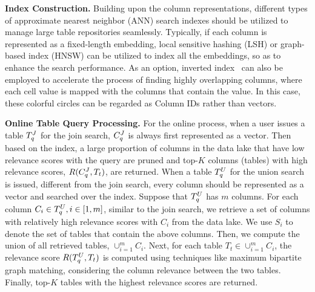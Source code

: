 
\noindent\textbf{Index Construction.} Building upon the  column representations, different types of approximate nearest neighbor (ANN) search indexes should be utilized to manage large table repositories seamlessly. Typically, if each column is represented as a fixed-length embedding, local sensitive hashing (LSH) or graph-based index (HNSW) can be utilized to index all the embeddings, so as to enhance the search performance.
 As an option, inverted index~\cite{} can also be employed  to  accelerate the process of finding highly overlapping columns, where each cell value is mapped with the columns that contain the value. In this case, these colorful circles can be regarded as  Column IDs rather than vectors.





\noindent\textbf{Online Table Query Processing.} For the online process, when a user issues a table $T^J_q$ for the join search, $C^J_q$ is always first represented as a vector. Then based on the index, a large proportion of columns in the data lake that have low relevance scores with the query are pruned and top-$K$ columns (tables) with high relevance scores, \ie $R(C^J_q, T_t)$, are returned. When a table $T^U_q$ for the union search is issued, different from the join search, every column should be represented as a vector and searched over the index.
Suppose that $T^U_q$ has $m$ columns. 
 For each column $C_i \in T^U_q, i \in [1,m]$, similar to the join search, we retrieve a set of columns with relatively high relevance scores with $C_i$ from the data lake. We use $S_i$ to denote the set of tables that contain the above columns.
Then, we compute the union of all retrieved tables, \ie $\cup_{i=1}^m C_i$. Next, for each table $T_t \in \cup_{i=1}^m C_i$, the relevance score $R(T^U_q, T_t)$ is computed using techniques  like maximum bipartite graph matching, considering the column relevance between the two tables. Finally, top-$K$ tables with the highest relevance scores are returned.






